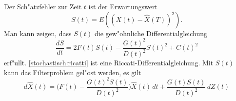 Der Sch"atzfehler zur Zeit $t$ ist der Erwartungswert
\[
S(t) = E((X(t)-\hat X(T))^2).
\]
Man kann zeigen, dass $S(t)$ die gew"ohnliche Differentialgleichung
\begin{equation}
\frac{dS}{dt}
=
2F(t)S(t) - \frac{G(t)^2}{D(t)^2}S(t)^2 +C(t)^2
\label{stochastisch:ricatti}
\end{equation}
erf"ullt.
\eqref{stochastisch:ricatti} ist eine Riccati-Differentialgleichung.
Mit $S(t)$ kann das Filterproblem gel"ost werden, es gilt
\begin{equation}
d\hat X(t)
=
\biggl(F(t)-\frac{G(t)^2S(t)}{D(t)^2}\biggr)\hat X(t)\,dt 
+
\frac{G(t)S(t)}{D(t)^2}\,dZ(t)
\end{equation}






